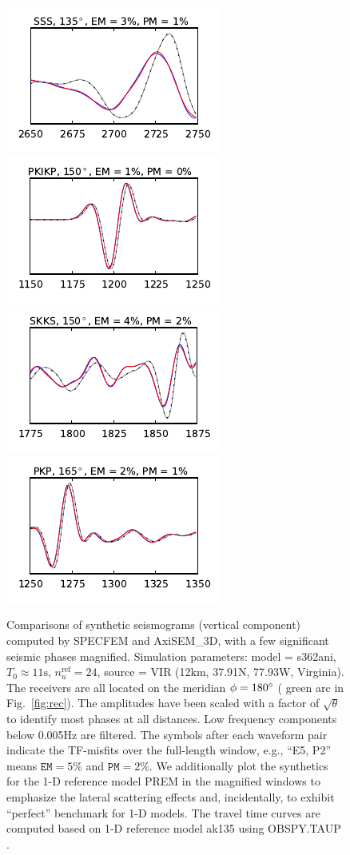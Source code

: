 \documentclass[extra]{gji}
\begin{document}
\begin{figure}
  \includegraphics[width=.25\textwidth]{fig/section/13.pdf}\hspace{-5pt}
  \includegraphics[width=.25\textwidth]{fig/section/14.pdf}\hspace{-5pt}
  \includegraphics[width=.25\textwidth]{fig/section/15.pdf}\hspace{-5pt}
  \includegraphics[width=.25\textwidth]{fig/section/16.pdf}\vspace{-5pt}
  \caption{Comparisons of synthetic seismograms (vertical component) computed 
  by SPECFEM and AxiSEM\_3D, with a few significant seismic phases magnified.
  Simulation parameters: model = s362ani, 
  $T_0\approx11\text{s}$, $n_u^\text{ref}=24$, 
  source = VIR (12km, 37.91\degr N, 77.93\degr W, Virginia). 
  The receivers are all located on the meridian $\phi=180\hbox{$^\circ$}$ (
  green arc in Fig.~\ref{fig:rec}). 
  The amplitudes have been scaled with a factor of $\sqrt\theta$ 
  to identify most phases at all distances. 
  Low frequency components below 0.005Hz are filtered.
  The symbols after each waveform pair indicate the TF-misfits over the full-length 
  window, e.g., ``E5, P2'' means $\mathtt{EM}=5\%$ and $\mathtt{PM}=2\%$.
  We additionally plot the synthetics for the 1-D reference model PREM in the 
  magnified windows to emphasize the lateral scattering effects
  and, incidentally, to exhibit ``perfect'' benchmark for 1-D models. 
  The travel time curves are computed based on 1-D reference model ak135 
  \cite[]{kennett1995constraints} using OBSPY.TAUP \cite[]{krischer2015obspy}. }
  \label{fig:freq}
\end{figure} 
\end{document}

